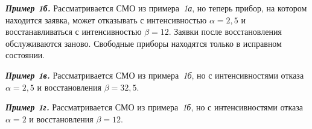 \begin{multicols}{2}
{\bfseries\textit{Пример 1б.}}
Рассматривается СМО из примера~\textit{1а}, но теперь прибор, на котором находится
заявка, может отказывать с интенсивностью $\alpha = 2{,}5$
и восстанавливаться с интенсивностью $\beta= 12$.
Заявки после восстановления обслуживаются заново.
Свободные приборы находятся только в исправном состоянии.

{\bfseries\textit{Пример 1в.}}
Рассматривается СМО из примера~\textit{1б}, но с интенсивностями отказа
$\alpha = 2{,}5$ и восстановления $\beta= 32{,}5$.

{\bfseries\textit{Пример 1г.}}
Рассматривается СМО из примера~\textit{1б}, но с интенсивностями отказа
$\alpha = 2$ и восстановления $\beta= 12$.

\begin{table*}\small  %
\begin{center}
\vspace*{2ex}


\end{center}
\end{table*}
\end{multicols}
